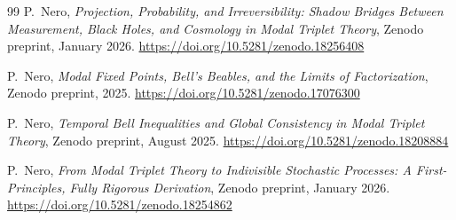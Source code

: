 \documentclass[11pt]{article}
\begin{document}
\begin{thebibliography}{99}
P.~Nero,
\emph{Projection, Probability, and Irreversibility: Shadow Bridges Between Measurement, Black Holes, and Cosmology in Modal Triplet Theory},
Zenodo preprint, January 2026.
\url{https://doi.org/10.5281/zenodo.18256408}

P.~Nero,
\emph{Modal Fixed Points, Bell's Beables, and the Limits of Factorization},
Zenodo preprint, 2025.
\url{https://doi.org/10.5281/zenodo.17076300}

P.~Nero,
\emph{Temporal Bell Inequalities and Global Consistency in Modal Triplet Theory},
Zenodo preprint, August 2025.
\url{https://doi.org/10.5281/zenodo.18208884}

P.~Nero,
\emph{From Modal Triplet Theory to Indivisible Stochastic Processes: A First-Principles, Fully Rigorous Derivation},
Zenodo preprint, January 2026.
\url{https://doi.org/10.5281/zenodo.18254862}

\end{thebibliography}
\end{document}
